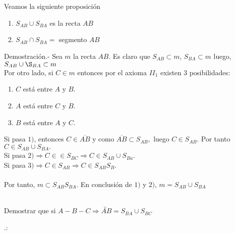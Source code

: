 \chapter{}
\begin{proposicion} Veamos la siguiente proposición

    \begin{enumerate}[\bfseries a)]
	\item $S_{AB} \cup S_{BA}$ es la recta $AB$
	\item $S_{AB} \cap S_{BA} =$ segmento $AB$\\
    \end{enumerate}
    Demostración.- \; Sea $m$ la recta $AB$. Es claro que $S_{AB} \subset m$, $S_{BA} \subset m$ luego, $S_{AB} \cup \S_{BA} \subset m$\\
    Por otro lado, si $C \in m$ entonces por el axioma $II_1$ existen 3 posibilidades:
    \begin{enumerate}[\bfseries 1)]
    \item $C$ está entre $A$ y $B$.
    \item $A$ está entre $C$ y $B$.
    \item $B$ está entre $A$ y $C$.
    \end{enumerate}
    Si pasa $1)$, entonces $C \in \overline{AB}$ y como $\overline{AB} \subset S_{AB},$ luego $C \in S_{AB}.$ Por tanto $C \in S_{AB} \cup S_{BA}.$\\
    Si pasa $2) \Rightarrow C \in \in S_{BC} \Rightarrow C \in S_{AB} \cup S_{Ba}.$ \\
    Si pasa $3) \Rightarrow C \in S_{AB} \Rightarrow C \in S_{A B} S_{B}.$\\\\
    Por tanto, $m \subset S_{AB} S_{BA}$. En conclusión de $1)$ y $2)$, $m = S_{AB} \cup S_{BA}$\\\\ 

\end{proposicion}

\begin{ej}
    Demostrar que si $A-B-C \Rightarrow \overleftrightarrow{AB} = S_{BA} \cup S_{BC}$ 
\end{ej}.:
